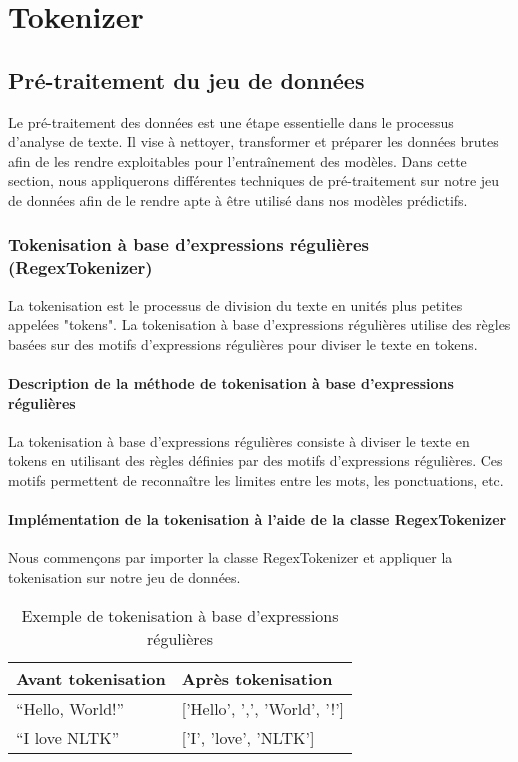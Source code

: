 \chapter{Tokenizer}

\section{Pré-traitement du jeu de données}

Le pré-traitement des données est une étape essentielle dans le processus d'analyse de texte. Il vise à nettoyer, transformer et préparer les données brutes afin de les rendre exploitables pour l'entraînement des modèles. Dans cette section, nous appliquerons différentes techniques de pré-traitement sur notre jeu de données afin de le rendre apte à être utilisé dans nos modèles prédictifs.

\subsection{Tokenisation à base d’expressions régulières (RegexTokenizer)}

La tokenisation est le processus de division du texte en unités plus petites appelées "tokens". La tokenisation à base d’expressions régulières utilise des règles basées sur des motifs d'expressions régulières pour diviser le texte en tokens.

\subsubsection*{Description de la méthode de tokenisation à base d'expressions régulières}

La tokenisation à base d'expressions régulières consiste à diviser le texte en tokens en utilisant des règles définies par des motifs d'expressions régulières. Ces motifs permettent de reconnaître les limites entre les mots, les ponctuations, etc.

\subsubsection*{Implémentation de la tokenisation à l'aide de la classe RegexTokenizer}

Nous commençons par importer la classe RegexTokenizer et appliquer la tokenisation sur notre jeu de données.

\begin{table}[h]
\centering
\begin{tabular}{|l|l|}
\hline
\textbf{Avant tokenisation} & \textbf{Après tokenisation} \\ \hline
``Hello, World!'' & ['Hello', ',', 'World', '!'] \\ \hline
``I love NLTK'' & ['I', 'love', 'NLTK'] \\ \hline
\end{tabular}
\caption{Exemple de tokenisation à base d'expressions régulières}
\end{table}

